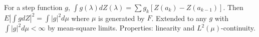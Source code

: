 For a step function $g$, $\int g(\lambda) dZ(\lambda) = \sum g_k [Z(a_k) - Z(a_{k-1})]$. Then $E|\int g dZ|^2 = \int |g|^2 d\mu$ where $\mu$ is generated by $F$. Extended to any $g$ with $\int |g|^2 d\mu < \infty$ by mean-square limits. Properties: linearity and $L^2(\mu)$-continuity.
